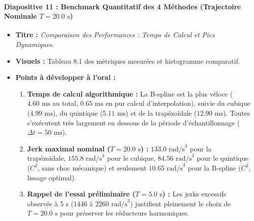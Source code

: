 \documentclass[11pt,a4paper]{report}
\begin{document}
\paragraph{Diapositive 11 : Benchmark Quantitatif des 4 Méthodes (Trajectoire Nominale $T = 20.0\text{ s}$)}
\begin{itemize}
    \item \textbf{Titre :} \textit{Comparaison des Performances : Temps de Calcul et Pics Dynamiques}.
    \item \textbf{Visuels :} Tableau 8.1 des métriques mesurées et histogramme comparatif.
    \item \textbf{Points à développer à l'oral :}
    \begin{enumerate}
        \item \textbf{Temps de calcul algorithmique :} La B-spline est la plus véloce ($4.60\text{ ms}$ au total, $0.65\text{ ms}$ en pur calcul d'interpolation), suivie du cubique ($4.99\text{ ms}$), du quintique ($5.11\text{ ms}$) et de la trapézoïdale ($12.90\text{ ms}$). Toutes s'exécutent très largement en dessous de la période d'échantillonnage ($\Delta t = 50\text{ ms}$).
        \item \textbf{Jerk maximal nominal ($T = 20.0\text{ s}$) :} $133.0\text{ rad/s}^3$ pour la trapézoïdale, $155.8\text{ rad/s}^3$ pour le cubique, $84.56\text{ rad/s}^3$ pour le quintique ($C^2$, sans choc mécanique) et seulement $10.65\text{ rad/s}^3$ pour la B-spline ($C^2$, lissage optimal).
        \item \textbf{Rappel de l'essai préliminaire ($T = 5.0\text{ s}$) :} Les jerks excessifs observés à 5 s ($1446$ à $2260\text{ rad/s}^3$) justifient pleinement le choix de $T = 20.0\text{ s}$ pour préserver les réducteurs harmoniques.
    \end{enumerate}
\end{itemize}
\end{document}
